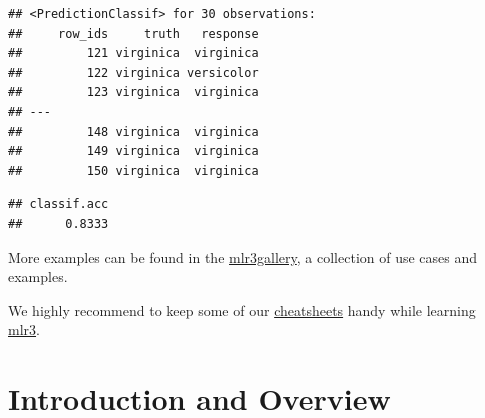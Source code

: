 \documentclass[
]{scrbook}
\newenvironment{Shaded}{\begin{snugshade}}{\end{snugshade}}
\newcommand{\AttributeTok}[1]{\textcolor[rgb]{0.77,0.63,0.00}{#1}}
\newcommand{\CommentTok}[1]{\textcolor[rgb]{0.56,0.35,0.01}{\textit{#1}}}
\newcommand{\DecValTok}[1]{\textcolor[rgb]{0.00,0.00,0.81}{#1}}
\newcommand{\FunctionTok}[1]{\textcolor[rgb]{0.00,0.00,0.00}{#1}}
\newcommand{\NormalTok}[1]{#1}
\newcommand{\OtherTok}[1]{\textcolor[rgb]{0.56,0.35,0.01}{#1}}
\newcommand{\SpecialCharTok}[1]{\textcolor[rgb]{0.00,0.00,0.00}{#1}}
\newcommand{\StringTok}[1]{\textcolor[rgb]{0.31,0.60,0.02}{#1}}
\renewenvironment{Shaded} {\begin{snugshade}\small} {\end{snugshade}}
\begin{document}
\begin{Shaded}
\end{Shaded}

\begin{verbatim}
## <PredictionClassif> for 30 observations:
##     row_ids     truth   response
##         121 virginica  virginica
##         122 virginica versicolor
##         123 virginica  virginica
## ---                             
##         148 virginica  virginica
##         149 virginica  virginica
##         150 virginica  virginica
\end{verbatim}

\begin{Shaded}
\end{Shaded}

\begin{verbatim}
## classif.acc 
##      0.8333
\end{verbatim}

More examples can be found in the \href{https://mlr3gallery.mlr-org.com}{mlr3gallery}, a collection of use cases and examples.

We highly recommend to keep some of our \href{https://cheatsheets.mlr-org.com}{cheatsheets} handy while learning \href{https://mlr3.mlr-org.com}{mlr3}.

\hypertarget{introduction}{%
\chapter{Introduction and Overview}\label{introduction}}
\end{document}
